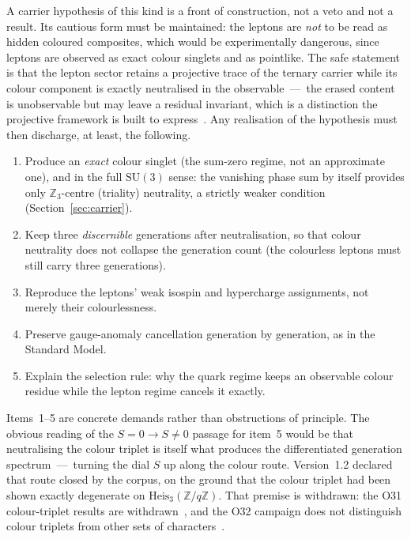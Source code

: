 \documentclass[11pt]{article}
\theoremstyle{definition}
\theoremstyle{remark}
\begin{document}
    A carrier hypothesis of this kind is a front of construction, not a veto and not a result.
    Its cautious form must be maintained: the leptons are \emph{not} to be read as hidden coloured composites,
    which would be experimentally dangerous, since leptons are observed as exact colour singlets and as pointlike.
    The safe statement is that the lepton sector retains a projective trace of the ternary carrier while its colour
    component is exactly neutralised in the observable~---~the erased content is unobservable but may leave a
    residual invariant, which is a distinction the projective framework is built to express~\cite{Beau2026l}.
    Any realisation of the hypothesis must then discharge, at least, the following.
    \begin{enumerate}
      \item Produce an \emph{exact} colour singlet (the sum-zero regime, not an approximate one), and in the full
        $\mathrm{SU}(3)$ sense: the vanishing phase sum by itself provides only $\mathbb{Z}_3$-centre (triality)
        neutrality, a strictly weaker condition (Section~\ref{sec:carrier}).
      \item Keep three \emph{discernible} generations after neutralisation, so that colour neutrality does not
        collapse the generation count (the colourless leptons must still carry three generations).
      \item Reproduce the leptons' weak isospin and hypercharge assignments, not merely their colourlessness.
      \item Preserve gauge-anomaly cancellation generation by generation, as in the Standard Model.
      \item Explain the selection rule: why the quark regime keeps an observable colour residue while the lepton
        regime cancels it exactly.
    \end{enumerate}
    Items~1--5 are concrete demands rather than obstructions of principle.
    The obvious reading of the $S = 0 \to S \neq 0$ passage for item~5 would be that neutralising the colour triplet
    is itself what produces the differentiated generation spectrum~---~turning the dial $S$ up along the colour route.
    Version~1.2 declared that route closed by the corpus, on the ground that the colour triplet had been shown
    exactly degenerate on $\mathrm{Heis}_3(\mathbb{Z}/q\mathbb{Z})$.
    That premise is withdrawn: the O31 colour-triplet results are withdrawn~\cite{Beau2026a35}, and the O32
    campaign does not distinguish colour triplets from other sets of characters~\cite{Beau2026a36}.
\end{document}
